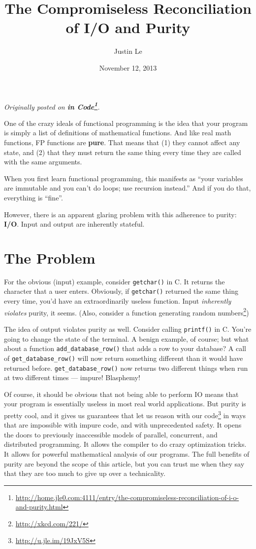 \documentclass[]{article}
\title{The Compromiseless Reconciliation of I/O and Purity}
\author{Justin Le}
\date{November 12, 2013}
\renewcommand{\href}[2]{#2\footnote{\url{#1}}}
\begin{document}
\maketitle

\emph{Originally posted on
\textbf{\href{http://home.jle0.com:4111/entry/the-compromiseless-reconciliation-of-i-o-and-purity.html}{in
Code}}.}

One of the crazy ideals of functional programming is the idea that your program is simply a list of
definitions of mathematical functions. And like real math functions, FP functions are \textbf{pure}.
That means that (1) they cannot affect any state, and (2) that they must return the same thing every
time they are called with the same arguments.

When you first learn functional programming, this manifests as ``your variables are immutable and
you can't do loops; use recursion instead.'' And if you do that, everything is ``fine''.

However, there is an apparent glaring problem with this adherence to purity: \textbf{I/O}. Input and
output are inherently stateful.

\section{The Problem}\label{the-problem}

For the obvious (input) example, consider \texttt{getchar()} in C. It returns the character that a
user enters. Obviously, if \texttt{getchar()} returned the same thing every time, you'd have an
extraordinarily useless function. Input \emph{inherently violates} purity, it seems. (Also, consider
a \href{http://xkcd.com/221/}{function generating random numbers})

The idea of output violates purity as well. Consider calling \texttt{printf()} in C. You're going to
change the state of the terminal. A benign example, of course; but what about a function
\texttt{add\_database\_row()} that adds a row to your database? A call of
\texttt{get\_database\_row()} will now return something different than it would have returned
before. \texttt{get\_database\_row()} now returns two different things when run at two different
times --- impure! Blasphemy!

Of course, it should be obvious that not being able to perform IO means that your program is
essentially useless in most real world applications. But purity is pretty cool, and it gives us
guarantees that let us \href{http://u.jle.im/19JxV5S}{reason with our code} in ways that are
impossible with impure code, and with unprecedented safety. It opens the doors to previously
inaccessible models of parallel, concurrent, and distributed programming. It allows the compiler to
do crazy optimization tricks. It allows for powerful mathematical analysis of our programs. The full
benefits of purity are beyond the scope of this article, but you can trust me when they say that
they are too much to give up over a technicality.
\end{document}
